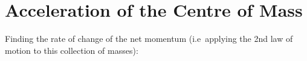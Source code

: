 \section{Acceleration of the Centre of Mass}
Finding the rate of change of the net momentum (i.e\ applying the 2nd law of
motion to this collection of masses):
%  
%
%
%  

%
%
